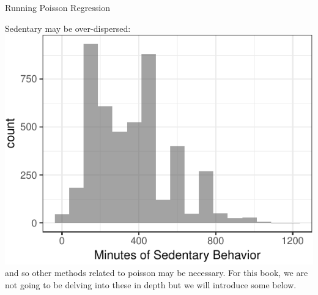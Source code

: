 \begin{frame}{Running Poisson Regression}

Sedentary may be over-dispersed:
\includegraphics{05_GeneralizedLinearModels_files/figure-beamer/unnamed-chunk-6-1.pdf}
and so other methods related to poisson may be necessary. For this book,
we are not going to be delving into these in depth but we will introduce
some below.

\end{frame}

